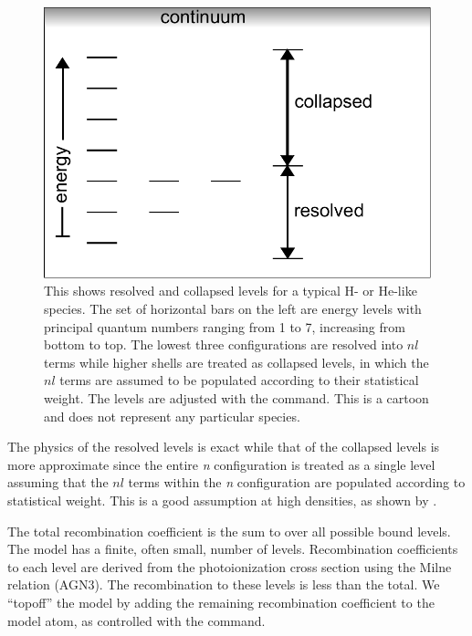 \begin{figure}
\centering
\includegraphics[scale=0.7]{LevelsResolvedCollapsed}
\caption[Resolved and collapsed levels]
{\label{fig:LevelsResolvedCollapsed}This shows  
resolved and collapsed levels for a typical H- or He-like species.
The set of horizontal bars on the left are energy levels with
principal quantum numbers ranging from 1 to 7, increasing from bottom to top.
The lowest three configurations are resolved into $nl$ terms while
higher shells are treated as collapsed levels, in which the $nl$ terms
are assumed to be populated according to their statistical weight.
The levels are adjusted with the  command.
This is a cartoon and does not represent any particular species.}
\end{figure}

The physics of the resolved levels is exact while that of the
collapsed levels is more approximate since the entire \emph{n} configuration is
treated as a single level assuming that the $nl$ terms within the \emph{n} configuration 
are populated according to statistical weight.
This is a good assumption at high densities, as
shown by \citet{PengellySeaton1964}.

The total recombination coefficient is the sum to over all possible bound levels.
The model has a finite, often small, number of levels. 
Recombination coefficients to each level are derived from the photoionization cross
section using the Milne relation (AGN3).
The recombination to these levels is less than the total.
We ``topoff'' the model by adding the remaining recombination coefficient
to the model atom, as controlled with the
 command.

